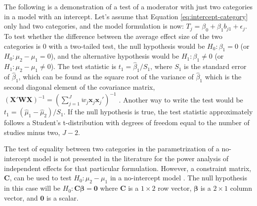 The following is a demonstration of a test of a moderator with just two categories in a model with an intercept. Let's assume that Equation \ref{eq:intercept-category} only had two categories, and the model formulation is now: $T_j = \beta_0 + \beta_1 b_{j1} + \epsilon_j$. To test whether the difference between the average effect size of the two categories is 0 with a two-tailed test, the null hypothesis would be $H_0: \beta_1 = 0$ (or $H_0: \mu_2 - \mu_1 = 0$), and the alternative hypothesis would be $H_1: \beta_1 \neq 0$ (or $H_1: \mu_2 - \mu_1 \neq 0$). The test statistic is $t_1 = \hat{\beta}_1 / S_1$, where $S_1$ is the standard error of $\hat{\beta}_1$, which can be found as the square root of the variance of $\hat{\beta}_1$ which is the second diagonal element of the covariance matrix, $(\mathbf{X}'\mathbf{W}\mathbf{X})^{-1} = \left( \sum_{j=1}^J \ddot{w}_j\mathbf{x}_j\mathbf{x}_j' \right)^{-1}$ \autocite{cooper2019}. Another way to write the test would be $t_1 = (\hat{\mu}_1 - \hat{\mu}_2)  /S_1$. If the null hypothesis is true, the test statistic approximately follows a Student's t-distribution with degrees of freedom equal to the number of studies minus two, $J-2$.

The test of equality between two categories in the parametrization of a no-intercept model is not presented in the literature for the power analysis of independent effects for that particular formulation. However, a constraint matrix, $\mathbf{C}$, can be used to test $H_0: \mu_2 - \mu_1$ in a no-intercept model \autocite{pustejovsky2018}. The null hypothesis in this case will be $H_0: \mathbf{C}\mathbf{\beta} = \mathbf{0}$ where $\mathbf{C}$ is a $1 \times 2$ row vector, $\bm{\beta}$ is a $2 \times 1$ column vector, and $\mathbf{0}$ is a scalar. 


